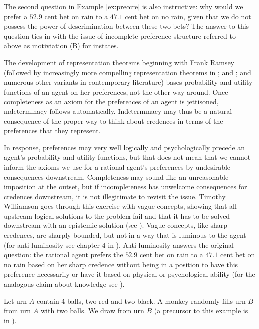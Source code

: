 \documentclass[11pt]{article}
\begin{document}
The second question in Example \ref{ex:preccre} is also instructive:
why would we prefer a $52.9$ cent bet on rain to a $47.1$ cent bet on
no rain, given that we do not possess the power of descrimination
between these two bets? The answer to this question ties in with the
issue of incomplete preference structure referred to above as
motiviation (B) for instates.

The development of representation theorems beginning with Frank Ramsey
(followed by increasingly more compelling representation theorems in
; and ; and numerous other
variants in contemporary literature) bases probability and utility
functions of an agent on her preferences, not the other way around.
Once completeness as an axiom for the preferences of an agent is
jettisoned, indeterminacy follows automatically. Indeterminacy may
thus be a natural consequence of the proper way to think about
credences in terms of the preferences that they represent.

In response, preferences may very well logically and psychologically
precede an agent's probability and utility functions, but that does
not mean that we cannot inform the axioms we use for a rational
agent's preferences by undesirable consequences downstream.
Completeness may sound like an unreasonable imposition at the outset,
but if incompleteness has unwelcome consequences for credences
downstream, it is not illegitimate to revisit the issue. Timothy
Williamson goes through this exercise with vague concepts, showing
that all upstream logical solutions to the problem fail and that it
has to be solved downstream with an epistemic solution (see
). Vague concepts, like sharp credences, are
sharply bounded, but not in a way that is luminous to the agent (for
anti-luminosity see chapter 4 in ).
Anti-luminosity answers the original question: the rational agent
prefers the $52.9$ cent bet on rain to a $47.1$ cent bet on no rain
based on her sharp credence without being in a position to have this
preference necessarily or have it based on physical or psychological
ability (for the analogous claim about knowledge see
).

\begin{quotex}
  \label{ex:monkey} Let urn $A$ contain 4
  balls, two red and two black. A monkey randomly fills urn $B$ from
  urn $A$ with two balls. We draw from urn $B$ (a precursor to this
  example is in ).
\end{quotex}
\end{document}
